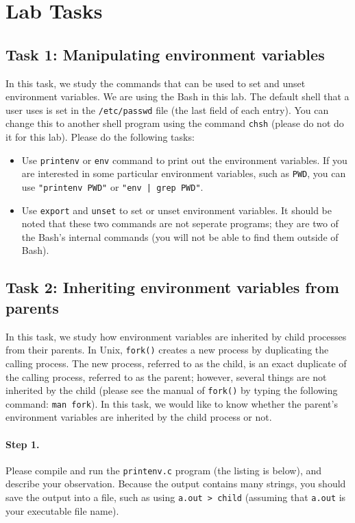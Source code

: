\section{Lab Tasks}

\subsection{Task 1: Manipulating environment variables}

In this task, we study the commands that can be used to set and unset
environment variables. We are using the Bash in this lab. The default
shell that a user uses is set in  the {\tt /etc/passwd} file (the last
field of each entry). You can change this to another shell program using
the command {\tt chsh} (please do not do it for this lab). Please 
do the following tasks:

\begin{itemize}
\item Use {\tt printenv} or {\tt env} command to print out the 
environment variables. If you are interested in some particular 
environment variables, such as {\tt PWD}, you can use {\tt "printenv PWD"}
or {\tt "env | grep PWD"}. 


\item Use {\tt export} and {\tt unset} to set or unset environment
variables. It should be noted that 
these two commands are not seperate programs; they are two of 
the Bash's internal commands (you will not be able to find them
outside of Bash).

\end{itemize}


\subsection{Task 2: Inheriting environment variables from parents}

In this task, we study how environment variables are inherited by 
child processes from their parents. In Unix,
{\tt fork()} creates a new process by duplicating the calling process.
The new process, referred to as the child, is an exact duplicate of the calling 
process, referred to as the parent; however, several things 
are not inherited by the child (please see the manual of {\tt fork()} by
typing the following command: {\tt man fork}). In this task,
we would like to know whether the parent's environment variables
are inherited by the child process or not.


\paragraph{Step 1.} Please compile and run the {\tt printenv.c}
program (the listing is below),  and describe your observation. Because the output 
contains many strings, you should save the output into a file, such as
using {\tt a.out > child} (assuming that {\tt a.out} is your 
executable file name).


